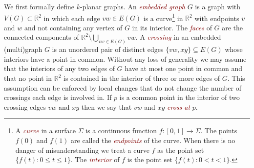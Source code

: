 \documentclass{patmorin}
\theoremstyle{plain}
\theoremstyle{definition}
\newcommand{\defin}[1]{\textcolor{Maroon}{\emph{#1}}}
\newcommand{\note}[2]{\noindent{\color{red}[#1:~#2]}}
\renewcommand{\le}{\leqslant}
\newcommand{\R}{\mathbb{R}}
\begin{document}
We first formally define $k$-planar graphs.  An \defin{embedded graph} $G$ is a graph with $V(G)\subset\R^2$ in which each edge $vw\in E(G)$ is a curve\footnote{A \defin{curve} in a surface $\Sigma$ is a continuous function $f:[0,1]\to \Sigma$. The points $f(0)$ and $f(1)$ are called the \defin{endpoints} of the curve.  When there is no danger of misunderstanding we treat a curve $f$ as the point set $\{f(t):0\le t\le 1\}$.  The \defin{interior} of $f$ is the point set $\{f(t):0<t<1\}$.} in $\R^2$ with endpoints $v$ and $w$ and not containing any vertex of $G$ in its interior. The \defin{faces} of $G$ are the connected components of $\R^2\setminus \bigcup_{vw\in E(G)} vw$. A \defin{crossing} in an embedded (multi)graph $G$ is an unordered pair of distinct edges $\{vw,xy\}\subseteq E(G)$ whose interiors have a point in common. Without any loss of generality we may assume that the interiors of any two edges of $G$ have at most one point in common and that no point in $\R^2$ is contained in the interior of three or more edges of $G$.  This assumption can be enforced by local changes that do not change the number of crossings each edge is involved in.  If $p$ is a common point in the interior of two crossing edges $vw$ and $xy$ then we say that $vw$ and $xy$ \defin{cross at} $p$.




%
\end{document}
